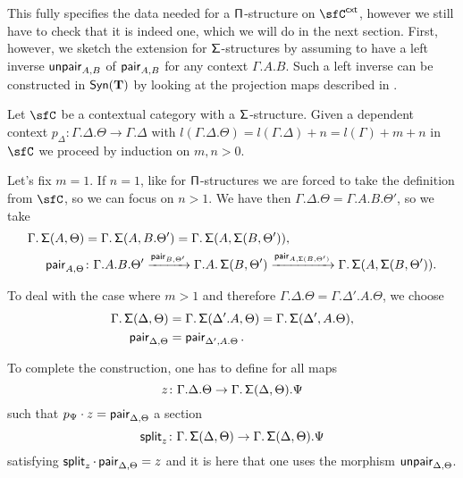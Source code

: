   \noindent
This fully specifies the data needed for a $\operatorname{\mathsf{\Pi}}$-structure on $\sfC^{\cxt}$,
however we still have to check that it is indeed one, which we will do in the
next section. First, however, we sketch the extension for $\operatorname{\mathsf{\Sigma}}$-structures
by assuming to have a left inverse $\operatorname{\mathsf{unpair}}_{A,B}$
of $\operatorname{\mathsf{pair}}_{A,B}$ for any context $\Gamma.A.B$. Such a left inverse can be
constructed in $\mathsf{Syn}(\mathbf{T})$ by looking at the projection maps described in
\cite[Sec.\ 1.6]{Uni13}.

\begin{construction}
  Let $\sfC$ be a contextual category with a $\operatorname{\mathsf{\Sigma}}$-structure. Given a
  dependent context $p_\Delta\colon\Gamma.\Delta.\Theta\rightarrow\Gamma.\Delta$
  with $l(\Gamma.\Delta.\Theta)=l(\Gamma.\Delta)+n=l(\Gamma)+m+n$ in $\sfC$ we
  proceed by induction on $m,n>0$.

  \noindent
  Let's fix $m=1$. If $n=1$, like for $\operatorname{\mathsf{\Pi}}$-structures we are forced to take
  the definition from $\sfC$, so we can focus on $n>1$. We have then
  $\Gamma.\Delta.\Theta=\Gamma.A.B.\Theta'$, so we take
  \begin{align*}
    \Gamma.\operatorname{\mathsf{\Sigma}}(A,\Theta)
    &=\Gamma.\operatorname{\mathsf{\Sigma}}(A,B.\Theta')
    =\Gamma.\operatorname{\mathsf{\Sigma}}(A,\operatorname{\mathsf{\Sigma}}(B,\Theta')), \\
    \operatorname{\mathsf{pair}}_{A,\Theta}
    &\colon
    \Gamma.A.B.\Theta'
    \xrightarrow{\operatorname{\mathsf{pair}}_{B,\Theta'}}
    \Gamma.A.\operatorname{\mathsf{\Sigma}}(B,\Theta')
    \xrightarrow{\operatorname{\mathsf{pair}}_{A,\operatorname{\mathsf{\Sigma}}(B,\Theta')}}
    \Gamma.\operatorname{\mathsf{\Sigma}}(A,\operatorname{\mathsf{\Sigma}}(B,\Theta')).
  \end{align*}

  \noindent
  To deal with the case where $m>1$ and therefore
  $\Gamma.\Delta.\Theta=\Gamma.\Delta'.A.\Theta$, we choose
  \begin{align*}
    \Gamma.\operatorname{\mathsf{\Sigma}}(\Delta,\Theta)
    &=\Gamma.\operatorname{\mathsf{\Sigma}}(\Delta'.A,\Theta)
    =\Gamma.\operatorname{\mathsf{\Sigma}}(\Delta',A.\Theta), \\
    \operatorname{\mathsf{pair}}_{\Delta,\Theta}
    &=\operatorname{\mathsf{pair}}_{\Delta',A.\Theta}.
  \end{align*}

  \noindent
  To complete the construction, one has to define for all maps
  \[z\colon\Gamma.\Delta.\Theta\rightarrow\Gamma.\operatorname{\mathsf{\Sigma}}(\Delta,\Theta).\Psi\]
  such that $p_\Psi\cdot z=\operatorname{\mathsf{pair}}_{\Delta,\Theta}$ a section
  \[\operatorname{\mathsf{split}}_z\colon\Gamma.\operatorname{\mathsf{\Sigma}}(\Delta,\Theta)
  \rightarrow\Gamma.\operatorname{\mathsf{\Sigma}}(\Delta,\Theta).\Psi\]
  satisfying
  $\operatorname{\mathsf{split}}_z\cdot\operatorname{\mathsf{pair}}_{\Delta,\Theta}=z$ and it is here that one uses the
  morphism $\operatorname{\mathsf{unpair}}_{\Delta,\Theta}$.
\end{construction}

